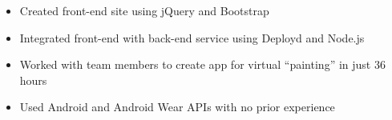 \documentclass[10pt]{article}
\begin{document}

	\begin{itemize}[noitemsep,topsep=0.25em]
		\item Created front-end site using jQuery and Bootstrap
		\item Integrated front-end with back-end service using Deployd and Node.js
	\end{itemize}


	\begin{itemize}[noitemsep,topsep=0.25em]
		\item Worked with team members to create app for virtual ``painting'' in just 36 hours
		\item Used Android and Android Wear APIs with no prior experience
	\end{itemize}
\end{document}
